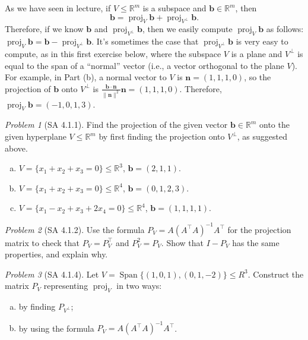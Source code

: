 \documentclass[11pt]{paper}
\theoremstyle{remark}
\newtheorem{problem}{Problem}
\newtheorem*{solution}{{\bf Solution}}
\newcommand\R{\fld{R}}
\newcommand\proj{\ensuremath{\operatorname{proj}}}
\renewcommand{\vec}[1]{\mathbf{#1}}
\newcommand{\<}{\ensuremath{\langle}}
\renewcommand{\>}{\ensuremath{\rangle}}
\newcommand\fld[1]{\ensuremath{\mathbb{#1}}}
\newcommand\vb{\vec{b}}
\newcommand\vn{\vec{n}}
\newcommand\Span{\ensuremath{\operatorname{Span}}}
\begin{document}
\newpage

\noindent As we have seen in lecture, if $V\leq \R^m$ is a subspace 
and $\vb\in \R^m$, then 
\[
\vb = \proj_V \vb + \proj_{V^\bot} \vb.
\]  
Therefore, if we know $\vb$ and $\proj_{V^\bot} \vb$, then we easily 
compute $\proj_V \vb$ as follows: $\proj_V \vb =\vb - \proj_{V^\bot} \vb$.  
It's sometimes the case that $\proj_{V^\bot}\vb$ is very easy to compute,
as in this first exercise below, where the subspace $V$ is a plane and
$V^{\bot}$ is equal to the span of a ``normal'' vector (i.e., a vector 
orthogonal to the plane $V$).  For example, in Part (b), a 
normal vector to $V$ is $\vn = (1,1,1,0)$, so the projection of $\vb$ 
onto $V^{\bot}$ is $\frac{\vb\cdot \vn}{\|\vn\|^2} \vn = (1,1,1,0)$.
Therefore, $\proj_V \vb  = (-1,0,1,3)$.

\begin{problem}[SA 4.1.1]
Find the projection of the given
vector $\vb \in \R^m$ onto the given hyperplane $V \leq \R^m$
by first finding the projection onto $V^\bot$, as suggested above.
\begin{enumerate}[(a)]
\item $V = \{x_1 + x_2 + x_3 = 0\} \leq \R^3$, $\vb = (2, 1, 1)$.
\item $V = \{x_1 + x_2 + x_3 = 0\} \leq \R^4$, $\vb = (0, 1, 2, 3)$.
\item $V = \{x_1 - x_2 + x_3 + 2x_4 = 0\} \leq \R^4$, $\vb = (1, 1, 1, 1)$.
\end{enumerate}
\end{problem}

\newpage

\begin{problem}[SA 4.1.2]
Use the formula $P_V = A(A^\top A)^{-1} A^\top$ 
for the projection matrix to check that 
$P_V = P_V^\top$ 
and 
$P_V^2 = P_V$.  Show that $I - P_V$ has the same properties, and explain why.
\end{problem}

\newpage

\begin{problem}[SA 4.1.4]
Let $V = \Span \{(1, 0, 1), (0, 1, -2)\} \leq R^3$. 
Construct the matrix $P_V$ representing $\proj_V$ in two ways:
\begin{enumerate}[(a)]
\item 
by finding $P_{V^\bot}$;
\item 
by using the formula $P_V = A(A^\top A)^{-1} A^\top$.
\end{enumerate}
\end{problem}
\end{document}
